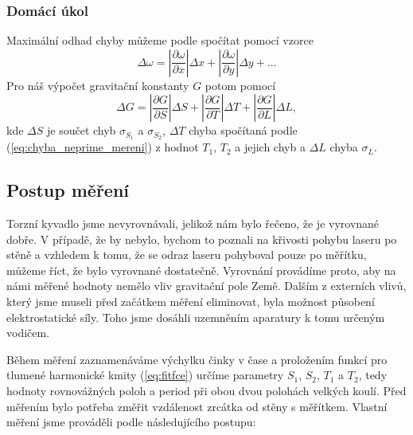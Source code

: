 \documentclass[english]{article}
\begin{document}
		\subsubsection{Domácí úkol}	
			Maximální odhad chyby můžeme podle \cite{bib:h3} spočítat pomocí vzorce
			\begin{equation}
				\Delta\omega = \left|\frac{\partial \omega}{\partial x}\right|\Delta x + \left|\frac{\partial \omega}{\partial y}\right|\Delta y + \ldots
			\end{equation}
			Pro náš výpočet gravitační konstanty $G$ potom pomocí
			\begin{equation}\label{eq:horni_odhad}
				\Delta G = \left|\frac{\partial G}{\partial S}\right|\Delta S + \left|\frac{\partial G}{\partial T}\right|\Delta T +  \left|\frac{\partial G}{\partial L}\right|\Delta L,
			\end{equation}
			kde $\Delta S$ je součet chyb $\sigma_{S_1}$ a $\sigma_{S_2}$, $\Delta T$ chyba spočítaná podle (\ref{eq:chyba_neprime_mereni}) z hodnot $T_1$, $T_2$ a jejich chyb a $\Delta L$ chyba $\sigma_L$.
	
	\subsection{Postup měření}
			Torzní kyvadlo jsme nevyrovnávali, jelikož nám bylo řečeno, že je vyrovnané dobře. V případě, že by nebylo, bychom to poznali na křivosti pohybu laseru po stěně a vzhledem k tomu, že se odraz laseru pohyboval pouze po měřítku, můžeme říct, že bylo vyrovnané dostatečně. Vyrovnání provádíme proto, aby na námi měřené hodnoty nemělo vliv gravitační pole Země. Dalším z externích vlivů, který jsme museli před začátkem měření eliminovat, byla možnost působení elektrostatické síly. Toho jsme dosáhli uzemněním aparatury k tomu určeným vodičem.  
			
			Během měření zaznamenáváme výchylku činky v čase a proložením funkcí pro tlumené harmonické kmity (\ref{eq:fitfce}) určíme parametry $S_1$, $S_2$, $T_1$ a $T_2$, tedy hodnoty rovnovážných poloh a period při obou dvou polohách velkých koulí. Před měřením bylo potřeba změřit vzdálenost zrcátka od stěny s měřítkem. Vlastní měření jsme prováděli podle následujícího postupu:
			
\end{document}
